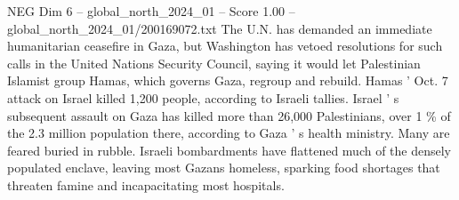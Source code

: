\begin{textsample}{NEG Dim 6 – global\_north\_2024\_01 – Score 1.00 – global\_north\_2024\_01/200169072.txt}
The U.N. has demanded an immediate humanitarian ceasefire in Gaza, but Washington has vetoed resolutions for such calls in the United Nations Security Council, saying it would let Palestinian Islamist group Hamas, which governs Gaza, regroup and rebuild.
Hamas ' Oct. 7 attack on Israel killed 1,200 people, according to Israeli tallies.
Israel ' s subsequent assault on Gaza has killed more than 26,000 Palestinians, over 1 \% of the 2.3 million population there, according to Gaza ' s health ministry.
Many are feared buried in rubble.
Israeli bombardments have flattened much of the densely populated enclave, leaving most Gazans homeless, sparking food shortages that threaten famine and incapacitating most hospitals.

\end{textsample}
